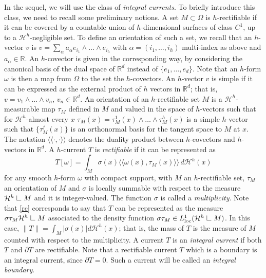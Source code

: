 \documentclass[11pt]{article}
\newcommand{\restr}{\ \rule{.4pt}{7pt}\rule{6pt}{.4pt}\ }
\begin{document}
In the sequel, we will use the class of {\em integral currents}. 
To briefly introduce this class, we need to recall some preliminary notions. A set $M\subset \Omega$ is $h$-rectifiable 
if it can be covered by a countable union of $h$-dimensional surfaces of class $C^1$, up to a $\mathcal H^h$-negligible set. 
To define an orientation of such a set, we recall that an $h$-vector $v$ is  
$v=\sum_{\alpha} a_\alpha e_{i_1}\wedge \dots\wedge e_{i_h}$ 
with $\alpha=(i_1,\dots, i_h)$ multi-index as above and $a_\alpha\in\mathbb R$. 
An $h$-covector is given in the corresponding way, by considering the canonical basis of the dual space of $\mathbb R^d$ instead of $\{e_1,\dots,e_d\}$. Note that an $h$-form $\omega$ 
is then a map from $\Omega$ to the set the $h$-covectors.  
An $h$-vector $v$ is simple if it can be expressed as the external product of $h$ vectors in $\mathbb R^d$; that is, $v=v_1\wedge\dots\wedge v_n$, $v_n\in\mathbb R^d$. An orientation of  an $h$-rectifiable set $M$ is a $\mathcal H^h$-measurable map $\tau_M$ defined in $M$ and valued in the space of $h$-vectors such that for $\mathcal H^h$-almost every $x$ $\tau_M(x)=\tau^1_M(x)\wedge\dots\wedge\tau^h_M(x)$ is a simple $h$-vector such that $\{\tau^j_M(x)\}$ is an orthonormal basis for the tangent space to $M$ at $x$. The notation $\langle\!\langle\cdot,\cdot \rangle\!\rangle$ denotes the duality product between $h$-covectors and $h$-vectors in $\mathbb R^d$.  
A $h$-current $T$ is {\em rectifiable} if it can be represented as 
\begin{equation}\label{rc}
T[\omega]=\int_M \sigma(x) \langle\!\langle \omega(x), \tau_M(x) \rangle\!\rangle\, d\mathcal H^h(x) 
\end{equation}
for any smooth $h$-form $\omega$ with compact support, with $M$ an $h$-rectifiable set, $\tau_M$ an orientation of $M$ and 
$\sigma$ is locally summable with respect to the measure $\mathcal H^h\restr M$ and it is integer-valued. 
The function $\sigma$ is called a {\em multiplicity}. Note that \eqref{rc} corresponds to say that $T$ can be represented as the measure $\sigma \tau_M \mathcal H^h\restr M$ associated to the density function $\sigma\tau_M\in L^1_{\rm loc}(\mathcal H^h\restr M)$. In this case, $\|T\|=\int_{M}|\sigma(x)|d\mathcal H^h(x)$; that is, the mass of $T$ is the measure of $M$ counted with respect to the multiplicity. 
A current $T$ is an {\em integral current} if both $T$ and $\partial T$ are rectifiable. 
Note that a rectifiable current $T$ which is a boundary is an integral current, since $\partial T=0$. Such a current will be called an {\em integral boundary}. 
  
\end{document}
